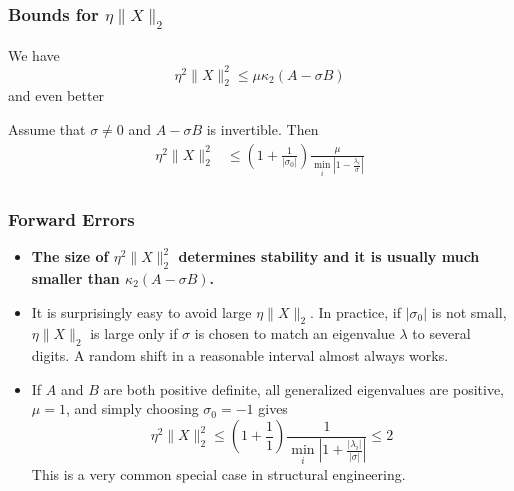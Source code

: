 \documentclass[landscape]{beamer}
\begin{document}
\begin{frame}
  \frametitle{Bounds for $\eta \|X\|_2$}

  We have
  \begin{equation*}
     \eta^2 \|X\|_2^2 \leq \mu \kappa_2(A-\sigma B)
  \end{equation*}
  and even better
  \begin{lemma}
    Assume that $\sigma \neq 0$ and $A-\sigma B$ is invertible.  Then
    \begin{align*}
      \eta^2 \|X\|_2^2 
      & \leq
      \left(1 + \frac{1}{|\sigma_0|}\right)
      \frac{\mu}{\min_i \left| 1 - \frac{\lambda_i}{\sigma}\right|} \\
    \end{align*}
  \end{lemma}
\end{frame}

\begin{frame}
  \frametitle{Forward Errors}


  \begin{itemize}
  \item {\bf The size of $\eta^2 \|X\|_2^2$ determines stability and
      it is usually much smaller than $\kappa_2(A-\sigma B)$.}
  \item It is surprisingly easy to avoid large $\eta \|X\|_2$.  In
    practice, if $|\sigma_0|$ is not small, $\eta \|X\|_2$ is large
    only if $\sigma$ is chosen to match an eigenvalue $\lambda$ to
    several digits.  A random shift in a reasonable interval almost
    always works.
  \item If $A$ and $B$ are both positive definite, all generalized eigenvalues
    are positive, $\mu = 1$, and simply choosing $\sigma_0 = -1$ gives
    \begin{equation*}
      \eta^2 \|X\|_2^2 \leq 
      \left(1 + \frac{1}{1}\right) \frac{1}{\min_i \left| 1 + \frac{|\lambda_i|}{|\sigma|}\right|} \leq 2
    \end{equation*}
   This is a very common special case in structural engineering.

  \end{itemize}
\end{frame}
\end{document}
